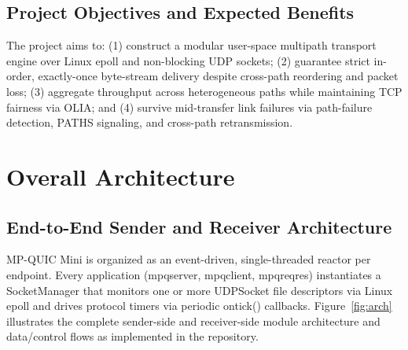 \documentclass[10pt,a4paper]{article}
\newcommand{\codeul}{\textunderscore\hspace{0pt}}
\DeclareRobustCommand{\code}[1]{{\ttfamily\let\_\codeul #1}}
\begin{document}
\subsection{Project Objectives and Expected Benefits}
The project aims to: (1) construct a modular user-space multipath transport engine over Linux \code{epoll} and non-blocking UDP sockets; (2) guarantee strict in-order, exactly-once byte-stream delivery despite cross-path reordering and packet loss; (3) aggregate throughput across heterogeneous paths while maintaining TCP fairness via OLIA; and (4) survive mid-transfer link failures via path-failure detection, \code{PATHS} signaling, and cross-path retransmission.

\section{Overall Architecture}

\subsection{End-to-End Sender and Receiver Architecture}
MP-QUIC Mini is organized as an event-driven, single-threaded reactor per endpoint. Every application (\code{mpq\_server}, \code{mpq\_client}, \code{mpq\_reqres}) instantiates a \code{SocketManager} that monitors one or more \code{UDPSocket} file descriptors via Linux \code{epoll} and drives protocol timers via periodic \code{on\_tick()} callbacks. Figure~\ref{fig:arch} illustrates the complete sender-side and receiver-side module architecture and data/control flows as implemented in the repository.
\end{document}
